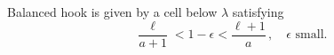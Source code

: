 \documentclass[dvipsnames]{beamer}
\theoremstyle{definition}
\newcounter{c}
\begin{document}
\begin{frame}
\begin{center}
\begin{tikzpicture}[xscale = 0.4,yscale = 0.4]
\end{tikzpicture}
\end{center} \pause
Balanced hook is given by a cell below \(\lambda\) satisfying \[
  \frac{\ell}{a+1} < 1-\epsilon < \frac{\ell+1}{a}\,,\quad \epsilon
  \text{ small}.
\]
\end{frame}
\end{document}
